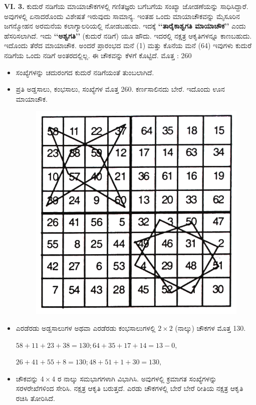 \medskip
\textbf{VI. 3.} ಕುದುರೆ ನಡಿಗೆಯ ಮಾಯಾಚೌಕಗಳಲ್ಲಿ ಗಣಿತಜ್ಞರು ಬಗೆಬಗೆಯ ಸಂಖ್ಯಾ \linebreak ಜೋಡಣೆಯನ್ನು ಸಾಧಿಸಿದ್ದಾರೆ. ಅವುಗಳಲ್ಲಿ ಏನಾದರೊಂದು ವಿಶೇಷತೆ ಇರುವುದು \linebreak ಸಾಮಾನ್ಯ. ಇಂತಹ ಒಂದು ಮಾಯಾಚೌಕವನ್ನು ಮೈಸೂರಿನ ಜಗನ್ಮೋಹನ ಅರಮನೆಯ ಕಲಾಗ್ಯಾಲರಿಯಲ್ಲಿ ನೋಡಬಹುದು. ಇದಕ್ಕೆ  \textbf{‘‘ತಾರೈಕಾಶ್ವಗತಿ ಮಾಯಾಚೌಕ’’} ಎಂದು ಹೆಸರಿಸ\-ಲಾಗಿದೆ. ಇದು \textbf{‘‘ಅಶ್ವಗತಿ’’} (ಕುದುರೆ ನಡಿಗೆ) ಯೂ ಹೌದು. ಇದರಲ್ಲಿ ನಕ್ಷತ್ರ ಆಕೃತಿಗಳನ್ನೂ ಕಾಣಬಹುದು. ಇದೊಂದು ತೆರೆದ ಮಾಯಾಚೌಕ. ಅಂದರೆ ಪ್ರಾರಂಭದ ಮನೆ (1) ಮತ್ತು ಕೊನೆಯ ಮನೆ (64) ಇವುಗಳು ಕುದುರೆ ನಡಿಗೆಯ ಒಂದು ನಡಿಗೆ ಅಂತರದಲ್ಲಿಲ್ಲ. ಈ ಚೌಕವನ್ನು ಕೆಳಗೆ ಕೊಟ್ಟಿದೆ. ಮೊತ್ತ : 260
\begin{itemize}
	\item ಸಂಖ್ಯೆಗಳನ್ನು ಚದುರಂಗದ ಕುದುರೆ ನಡಿಗೆಯಂತೆ ತುಂಬಲಾಗಿದೆ.
	\item ಪ್ರತಿ ಅಡ್ಡಸಾಲು, ಕಂಭಸಾಲು, ಸಂಖ್ಯೆಗಳ ಮೊತ್ತ 260. ಕರ್ಣಸಾಲಿನದು ಬೇರೆ. ಇದೊಂದು ಊನ ಮಾಯಾಚೌಕ.
	\begin{figure}[H]
	\includegraphics[scale=1.2]{src/figures/chap6/fig6-4.jpg}
	\end{figure}
	\item ಎರಡೆರಡು ಅಡ್ಡಸಾಲುಗಳ ಅಥವಾ ಎರಡೆರಡು ಕಂಭಸಾಲುಗಳಲ್ಲಿ $2 \times 2$ (ನಾಲ್ಕು) ಚೌಕಗಳ ಮೊತ್ತ 130.

	$58+11+23+38=130; 64+35+17+14=13-0,$

	$26+41+55+8= 130; 48+51+1+30=130,$
	\item ಚೌಕವನ್ನು $4 \times 4$ ರ ನಾಲ್ಕು ಸಮಭಾಗಗಳಾಗಿ ವಿಭಾಗಿಸಿ. ಅವುಗಳಲ್ಲಿ ಕ್ರಮಾಗತ ಸಂಖ್ಯೆ\-ಗಳನ್ನು ಸರಳರೇಖೆಗಳಿಂದ ಸೇರಿಸಿ. ನಕ್ಷತ್ರ ಆಕೃತಿ ಬರುತ್ತದೆ. ಎರಡು ಚೌಕ\-ಗಳಲ್ಲಿ ಬೇರೆ ಬೇರೆ ರೀತಿಯ ನಕ್ಷತ್ರ ಆಕೃತಿ ರಚಿಸಿ ತೋರಿಸಿದೆ.
\end{itemize}

